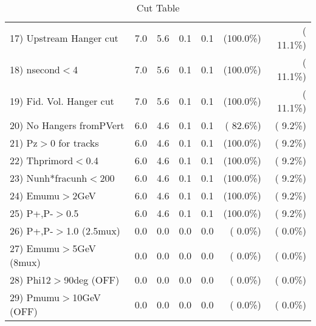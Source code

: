 \begin{table}[h!]
\begin{tabular}{||l||r|r|r|r|r|r||}
 17) Upstream Hanger cut  &          7.0 &          5.6 &          0.1 &          0.1 & (100.0\%) & ( 11.1\%) \\
 18) nsecond$<$4          &          7.0 &          5.6 &          0.1 &          0.1 & (100.0\%) & ( 11.1\%) \\
 19) Fid. Vol. Hanger cut &          7.0 &          5.6 &          0.1 &          0.1 & (100.0\%) & ( 11.1\%) \\
 20) No Hangers fromPVert &          6.0 &          4.6 &          0.1 &          0.1 & ( 82.6\%) & (  9.2\%) \\
 21) Pz$>$0 for tracks    &          6.0 &          4.6 &          0.1 &          0.1 & (100.0\%) & (  9.2\%) \\
 22) Thprimord$<$0.4      &          6.0 &          4.6 &          0.1 &          0.1 & (100.0\%) & (  9.2\%) \\
 23) Nunh*fracunh$<$200   &          6.0 &          4.6 &          0.1 &          0.1 & (100.0\%) & (  9.2\%) \\
 24) Emumu$>$2GeV         &          6.0 &          4.6 &          0.1 &          0.1 & (100.0\%) & (  9.2\%) \\
 25) P+,P-$>$0.5          &          6.0 &          4.6 &          0.1 &          0.1 & (100.0\%) & (  9.2\%) \\
 26) P+,P-$>$1.0 (2.5mux) &          0.0 &          0.0 &          0.0 &          0.0 & (  0.0\%) & (  0.0\%) \\
 27) Emumu$>$5GeV  (8mux) &          0.0 &          0.0 &          0.0 &          0.0 & (  0.0\%) & (  0.0\%) \\
 28) Phi12$>$90deg  (OFF) &          0.0 &          0.0 &          0.0 &          0.0 & (  0.0\%) & (  0.0\%) \\
 29) Pmumu$>$10GeV  (OFF) &          0.0 &          0.0 &          0.0 &          0.0 & (  0.0\%) & (  0.0\%) \\
 \hline
 \hline
 \end{tabular}
 \caption{Cut Table           }
 \label{tab-cutheavy_neutrino_1.000}
 \end{table}

